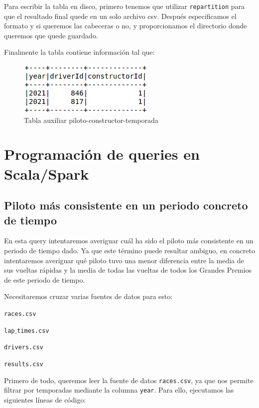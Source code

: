\documentclass[12pt,twoside,titlepage]{report}
\begin{document}
Para escribir la tabla en disco, primero tenemos que utilizar \texttt{repartition} para que el resultado final quede en un solo archivo csv. Después especificamos el formato y si queremos las cabeceras o no, y proporcionamos el directorio donde queremos que quede guardado.

Finalmente la tabla contiene información tal que:

\begin{figure}[H]
  \includegraphics[scale=0.7]{driv_const_ssn_table.png}
  \centering
  \caption{Tabla auxiliar piloto-constructor-temporada}
  \label{fig:driv_const_ssn_table}
  \centering
\end{figure}



\section{Programación de queries en Scala/Spark}

\subsection{Piloto más consistente en un periodo concreto de tiempo}
En esta query intentaremos averiguar cuál ha sido el piloto más consistente en un periodo de tiempo dado. Ya que este término puede resultar ambiguo, en concreto intentaremos averiguar qué piloto tuvo una menor diferencia entre la media de sus vueltas rápidas y la media de todas las vueltas de todos los Grandes Premios de este periodo de tiempo.

Necesitaremos cruzar varias fuentes de datos para esto: 

\begin{compactitem}
  \item \texttt{races.csv}
  \item \texttt{lap$\_$times.csv}
  \item \texttt{drivers.csv}
  \item \texttt{results.csv}
\end{compactitem}

Primero de todo, queremos leer la fuente de datos \texttt{races.csv}, ya que nos permite filtrar por temporadas mediante la columna \texttt{year}. Para ello, ejecutamos las siguientes líneas de código:
\end{document}
